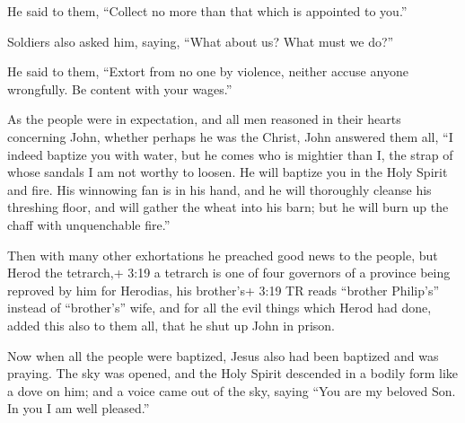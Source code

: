  He said to them, ``Collect no more than that which is
appointed to you.''

 Soldiers also asked him, saying, ``What about us? What
must we do?''

He said to them, ``Extort from no one by violence, neither accuse anyone
wrongfully. Be content with your wages.''

 As the people were in expectation, and all men reasoned in
their hearts concerning John, whether perhaps he was the Christ,
 John answered them all, ``I indeed baptize you with water,
but he comes who is mightier than I, the strap of whose sandals I am not
worthy to loosen. He will baptize you in the Holy Spirit and fire.
 His winnowing fan is in his hand, and he will thoroughly
cleanse his threshing floor, and will gather the wheat into his barn;
but he will burn up the chaff with unquenchable fire.''

 Then with many other exhortations he preached good news to
the people,  but Herod the tetrarch,+ 3:19 a tetrarch is
one of four governors of a province being reproved by him for Herodias,
his brother's+ 3:19 TR reads ``brother Philip's'' instead of
``brother's'' wife, and for all the evil things which Herod had done,
 added this also to them all, that he shut up John in
prison.

 Now when all the people were baptized, Jesus also had been
baptized and was praying. The sky was opened,  and the Holy
Spirit descended in a bodily form like a dove on him; and a voice came
out of the sky, saying ``You are my beloved Son. In you I am well
pleased.''

